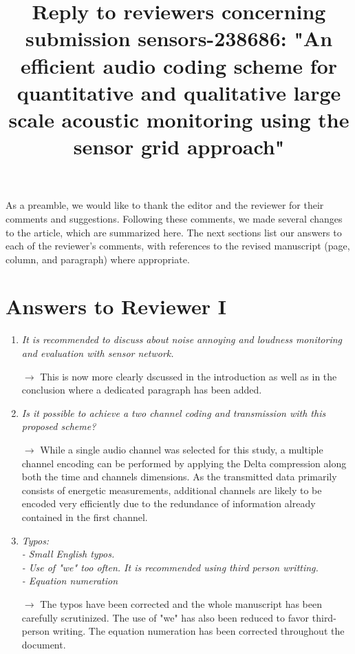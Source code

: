 \documentclass[10pt]{article}
\title{Reply to reviewers concerning submission sensors-238686: "An efficient audio coding scheme  for quantitative and qualitative large scale acoustic monitoring using the sensor grid approach"}
\begin{document}
\maketitle

As a preamble, we would like to thank the editor and the reviewer for their comments and suggestions. Following these comments, we made several changes to the article, which are summarized here. The next sections list our answers to each of the reviewer’s comments, with references to the revised manuscript (page, column, and paragraph) where appropriate.


\section{Answers to Reviewer I}

\begin{enumerate}

\item \emph{It is recommended to discuss about noise annoying and loudness monitoring and evaluation with sensor network.}

$\rightarrow$ This is now more clearly dscussed in the introduction as well as in the conclusion where a dedicated paragraph has been added.

\item \emph{Is it possible to achieve a two channel coding and transmission with this proposed scheme?}

$\rightarrow$ While a single audio channel was selected for this study, a multiple channel encoding can be performed by applying the Delta compression along both the time and channels dimensions. As the transmitted data primarily consists of energetic measurements, additional channels are likely to be encoded very efficiently due to the redundance of information already contained in the first channel.

\item \emph{Typos:\\
- Small English typos.\\
- Use of "we" too often. It is recommended using third person writting.\\
- Equation numeration}

$\rightarrow$ The typos have been corrected and the whole manuscript has been carefully scrutinized. The use of "we" has also been reduced to favor third-person writing. The equation numeration has been corrected throughout the document.

\end{enumerate}
\end{document}
